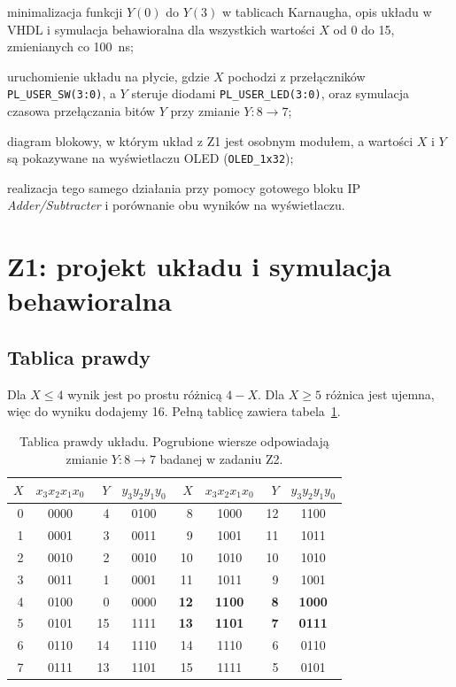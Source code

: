 \documentclass[11pt,a4paper]{article}
\begin{document}
\begin{description}[leftmargin=2.2em,style=sameline]
  \item[Z1] minimalizacja funkcji $Y(0)$ do $Y(3)$ w tablicach Karnaugha, opis układu w VHDL i symulacja behawioralna dla wszystkich wartości $X$ od 0 do 15, zmienianych co 100~ns;
  \item[Z2] uruchomienie układu na płycie, gdzie $X$ pochodzi z przełączników \texttt{PL\_USER\_SW(3:0)}, a $Y$ steruje diodami \texttt{PL\_USER\_LED(3:0)}, oraz symulacja czasowa przełączania bitów $Y$ przy zmianie $Y\colon 8 \to 7$;
  \item[Z3] diagram blokowy, w którym układ z Z1 jest osobnym modułem, a wartości $X$ i $Y$ są pokazywane na wyświetlaczu OLED (\texttt{OLED\_1x32});
  \item[Z4] realizacja tego samego działania przy pomocy gotowego bloku IP \emph{Adder/Subtracter} i porównanie obu wyników na wyświetlaczu.
\end{description}

\section{Z1: projekt układu i symulacja behawioralna}

\subsection{Tablica prawdy}

Dla $X \le 4$ wynik jest po prostu różnicą $4 - X$. Dla $X \ge 5$ różnica jest ujemna, więc do wyniku dodajemy 16. Pełną tablicę zawiera tabela~\ref{tab:prawda}.

\begin{table}[H]
\centering
\small
\begin{tabular}{rcrc@{\hspace{2.5em}}rcrc}
\toprule
$X$ & $x_3x_2x_1x_0$ & $Y$ & $y_3y_2y_1y_0$ & $X$ & $x_3x_2x_1x_0$ & $Y$ & $y_3y_2y_1y_0$\\
\midrule
0 & 0000 & 4  & 0100 & 8  & 1000 & 12 & 1100\\
1 & 0001 & 3  & 0011 & 9  & 1001 & 11 & 1011\\
2 & 0010 & 2  & 0010 & 10 & 1010 & 10 & 1010\\
3 & 0011 & 1  & 0001 & 11 & 1011 & 9  & 1001\\
4 & 0100 & 0  & 0000 & \textbf{12} & \textbf{1100} & \textbf{8} & \textbf{1000}\\
5 & 0101 & 15 & 1111 & \textbf{13} & \textbf{1101} & \textbf{7} & \textbf{0111}\\
6 & 0110 & 14 & 1110 & 14 & 1110 & 6  & 0110\\
7 & 0111 & 13 & 1101 & 15 & 1111 & 5  & 0101\\
\bottomrule
\end{tabular}
\caption{Tablica prawdy układu. Pogrubione wiersze odpowiadają zmianie $Y\colon 8 \to 7$ badanej w zadaniu Z2.}
\label{tab:prawda}
\end{table}
\end{document}
